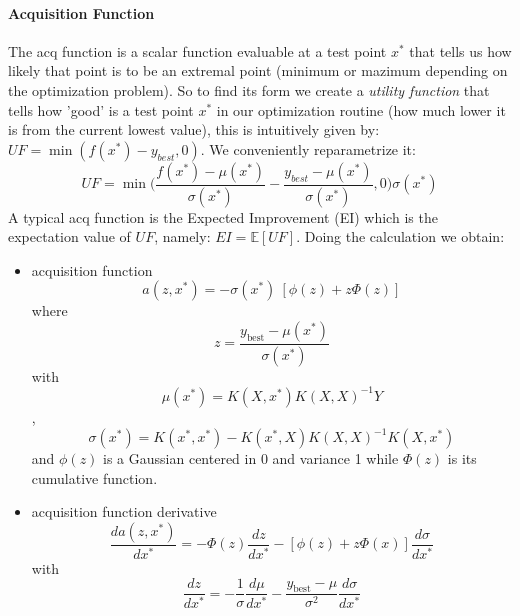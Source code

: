\documentclass[11pt, oneside]{article}   	%
\begin{document}
\paragraph{Acquisition Function}
The acq function is a scalar function evaluable at a test point $x^*$ that tells us how likely that point is to be an extremal point (minimum or mazimum depending on the optimization problem). So to find its form we create a \textit{utility function} that tells how 'good' is a test point $x^*$ in our optimization routine (how much lower it is from the current lowest value), this is intuitively given by: $UF = \min (f(x^*) - y_{best}, 0)$. We conveniently reparametrize it:
$$UF = \min \bigg(\frac{f(x^*) - \mu(x^*)}{\sigma(x^*)} - \frac{y_{best} - \mu(x^*)}{\sigma(x^*)} , 0\bigg)\sigma(x^*)$$
A typical acq function is the Expected Improvement (EI) which is the expectation value of $UF$, namely: $EI = \mathbb{E}[UF]$. Doing the calculation we obtain:
\begin{itemize}
\item acquisition function
$$ a(z, x^*) = -\sigma(x^*) \ \left[ \phi(z)  + z \Phi(z)\right]$$
where $$z=\frac{y_\text{best} - \mu(x^*)}{\sigma(x^*)}$$
with $$ \mu(x^*) = K(X, x^*) K(X, X)^{-1} Y $$, $$ \sigma (x^*) = K(x^*, x^*) - K(x^*, X)K(X, X)^{-1}K(X, x^*) $$
and $\phi(z)$ is a Gaussian centered in 0 and variance 1 while $\Phi(z)$ is its cumulative function.
\item acquisition function derivative
$$\frac{d{a(z, x^*)}}{d x^*} = -\Phi(z) \frac{d z}{d x^*} - \left[\phi(z) +z \Phi(x)\right] \frac{d{\sigma}}{d x^*}$$
with
$$ \frac{d z}{d x^*} = -\frac{1}{\sigma} \frac{d \mu}{d x^*} - \frac{y_\text{best} - \mu}{\sigma^2} \frac{d{\sigma}}{d x^*}$$
\end{itemize}
\end{document}
